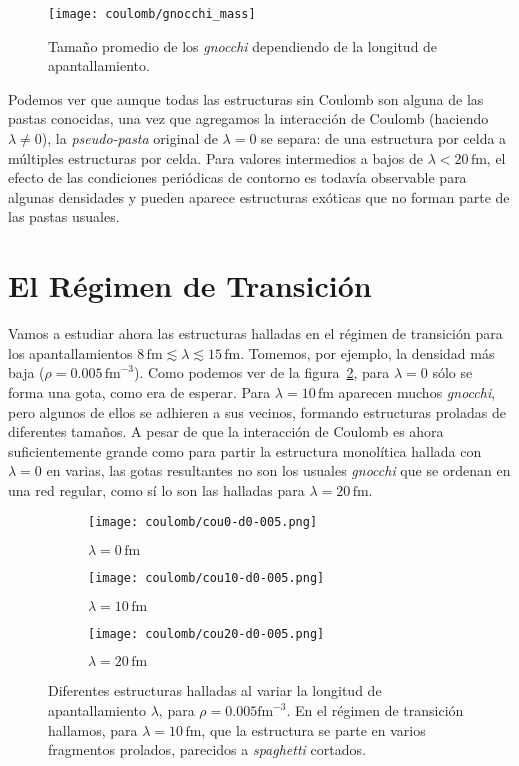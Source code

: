 \begin{figure}[h] %
\centering
\texttt{[image: coulomb/gnocchi\_mass]}
\caption{Tamaño promedio de los \emph{gnocchi} dependiendo de la longitud de apantallamiento.}
\label{fig:gnocchi_mass}
\end{figure}

Podemos ver que aunque todas las estructuras sin Coulomb son alguna de las pastas conocidas, una vez que agregamos la interacción de Coulomb (haciendo $\lambda\neq0$), la \emph{pseudo-pasta} original de $\lambda=0$ se separa: de una estructura por celda a múltiples estructuras por celda.
Para valores intermedios a bajos de $\lambda < 20\,\text{fm}$, el efecto de las condiciones periódicas de contorno es todavía observable para algunas densidades y pueden aparece estructuras exóticas que no forman parte de las pastas usuales.

\section{El Régimen de Transición} \label{transition}

Vamos a estudiar ahora las estructuras halladas en el régimen de transición para los apantallamientos $8\,\text{fm} \lesssim \lambda \lesssim 15\,\text{fm}$.
Tomemos, por ejemplo, la densidad más baja ($\rho=0.005\,\text{fm}^{-3}$).
Como podemos ver de la figura~\ref{fig:gnocchi}, para $\lambda=0$ sólo se forma una gota, como era de esperar.
Para $\lambda=10\,\text{fm}$ aparecen muchos \emph{gnocchi}, pero algunos de ellos se adhieren a sus vecinos, formando estructuras proladas de diferentes tamaños.
A pesar de que la interacción de Coulomb es ahora suficientemente grande como para partir la estructura monolítica hallada con $\lambda=0$ en varias, las gotas resultantes no son los usuales \emph{gnocchi} que se ordenan en una red regular, como sí lo son las halladas para $\lambda=20\,\text{fm}$.

\begin{figure}[h!]  \centering
  \begin{subfigure}[h!]{0.3\columnwidth}
    \centering
    \texttt{[image: coulomb/cou0-d0-005.png]}
    \caption{$\lambda=0\,\text{fm}$}
  \end{subfigure}
  \begin{subfigure}[h!]{0.3\columnwidth}
    \centering
    \texttt{[image: coulomb/cou10-d0-005.png]}
    \caption{$\lambda=10\,\text{fm}$}
  \end{subfigure}
  \begin{subfigure}[h!]{0.3\columnwidth}
    \centering
    \texttt{[image: coulomb/cou20-d0-005.png]}
    \caption{$\lambda=20\,\text{fm}$}
  \end{subfigure}
  \caption{Diferentes estructuras halladas al variar la longitud de apantallamiento $\lambda$, para $\rho=0.005\text{fm}^{-3}$.
    En el régimen de transición hallamos, para $\lambda=10\,\text{fm}$, que la estructura se parte en varios fragmentos prolados, parecidos a \emph{spaghetti} cortados.}
  \label{fig:gnocchi}
\end{figure}

